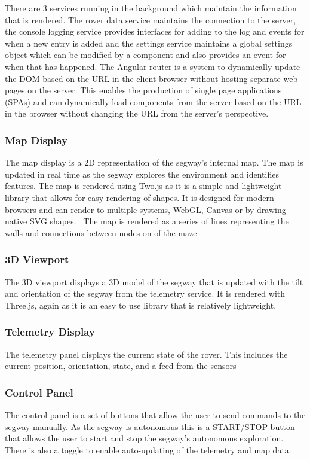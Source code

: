 There are 3 services running in the background which maintain the information that is rendered. 
The rover data service maintains the connection to the server, 
the console logging service provides interfaces for adding to the log and events for when a new entry is added and the settings service maintains a global settings object which can be modified by a component and also provides an event for when that has happened.
The Angular router is a system to dynamically update the DOM based on the URL in the client browser without hosting separate web pages on the server. This enables the production of single page applications (SPAs) and can dynamically load components from the server based on the URL in the browser without changing the URL from the server’s perspective.~\cite{ref:angular_router}

\subsubsection{Map Display}
The map display is a 2D representation of the segway's internal map. The map is updated in real time as the segway explores the environment and identifies features. The map is rendered using Two.js as it is a simple and lightweight library that allows for easy rendering of shapes. It is designed for modern browsers and can render to multiple systems, WebGL, Canvas or by drawing native SVG shapes.~\cite{ref:twojs} The map is rendered as a series of lines representing the walls and connections between nodes on of the maze

\subsubsection{3D Viewport}
The 3D viewport displays a 3D model of the segway that is updated with the tilt and orientation of the segway from the telemetry service. It is rendered with Three.js, again as it is an easy to use library that is relatively lightweight.~\cite{ref:threejs}

\subsubsection{Telemetry Display}
The telemetry panel displays the current state of the rover. This includes the current position, orientation, state, and a feed from the sensors

\subsubsection{Control Panel}
The control panel is a set of buttons that allow the user to send commands to the segway manually. As the segway is autonomous this is a START/STOP button that allows the user to start and stop the segway's autonomous exploration. There is also a toggle to enable auto-updating of the telemetry and map data.

